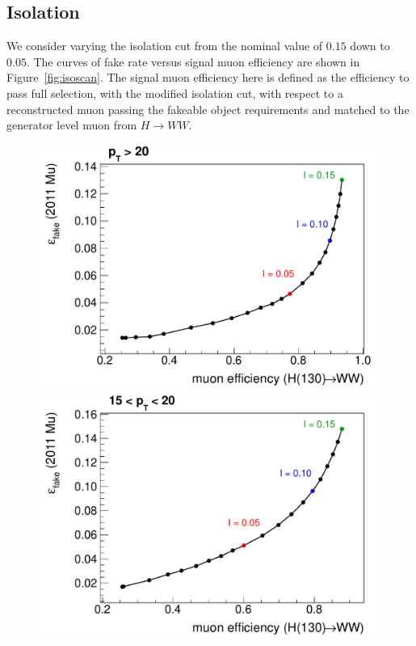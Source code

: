 \subsection{Isolation}
We consider varying the isolation cut from the nominal value of $0.15$ down to $0.05$. The curves of fake rate versus signal muon efficiency are shown in Figure~\ref{fig:isoscan}. The signal muon efficiency here is defined as the efficiency to pass full selection, with the modified isolation cut, with respect to a reconstructed muon passing the fakeable object requirements and matched to the generator level muon from $H\rightarrow WW$.

\begin{figure}[!htbp]
\begin{center}
\includegraphics[scale=0.4]{figures/isoscan0.pdf}
\includegraphics[scale=0.4]{figures/isoscan1.pdf}

\end{center}
\end{figure}
